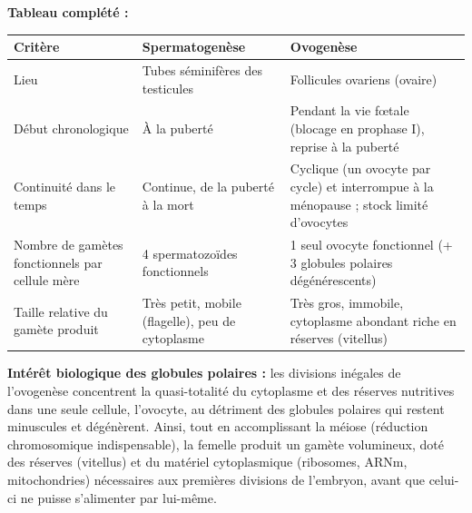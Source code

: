 \documentclass[11pt]{article}
\begin{document}
\begin{corrige}
\textbf{Tableau complété :}
\begin{center}
\begin{tabularx}{\linewidth}{|l|X|X|}
\hline
\rowcolor{popblueL} \textbf{Critère} & \textbf{Spermatogenèse} & \textbf{Ovogenèse} \\
\hline
Lieu & Tubes séminifères des testicules & Follicules ovariens (ovaire) \\
\hline
Début chronologique & À la puberté & Pendant la vie fœtale (blocage en prophase I), reprise à la puberté \\
\hline
Continuité dans le temps & Continue, de la puberté à la mort & Cyclique (un ovocyte par cycle) et interrompue à la ménopause ; stock limité d'ovocytes \\
\hline
Nombre de gamètes fonctionnels par cellule mère & 4 spermatozoïdes fonctionnels & 1 seul ovocyte fonctionnel (+ 3 globules polaires dégénérescents) \\
\hline
Taille relative du gamète produit & Très petit, mobile (flagelle), peu de cytoplasme & Très gros, immobile, cytoplasme abondant riche en réserves (vitellus) \\
\hline
\end{tabularx}
\end{center}

\textbf{Intérêt biologique des globules polaires :} les divisions inégales de l'ovogenèse concentrent la quasi-totalité du cytoplasme et des réserves nutritives dans une seule cellule, l'ovocyte, au détriment des globules polaires qui restent minuscules et dégénèrent. Ainsi, tout en accomplissant la méiose (réduction chromosomique indispensable), la femelle produit un gamète volumineux, doté des réserves (vitellus) et du matériel cytoplasmique (ribosomes, ARNm, mitochondries) nécessaires aux premières divisions de l'embryon, avant que celui-ci ne puisse s'alimenter par lui-même.
\end{corrige}
\end{document}
